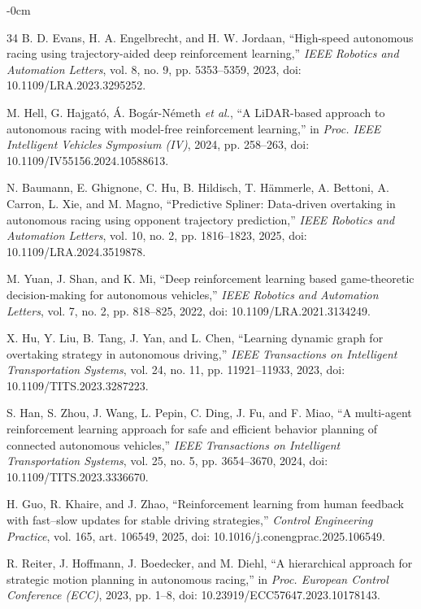 \documentclass[sensors,article,submit,moreauthors]{Definitions/mdpi}
\begin{document}
\begin{adjustwidth}{-\extralength}{0cm}
\begin{thebibliography}{34}
B. D. Evans, H. A. Engelbrecht, and H. W. Jordaan,
``High-speed autonomous racing using trajectory-aided deep reinforcement
learning,'' \emph{IEEE Robotics and Automation Letters}, vol. 8, no. 9,
pp. 5353--5359, 2023, doi: 10.1109/LRA.2023.3295252.

M. Hell, G. Hajgat\'o, \'A. Bog\'ar-N\'emeth \emph{et al.},
``A LiDAR-based approach to autonomous racing with model-free reinforcement
learning,'' in \emph{Proc. IEEE Intelligent Vehicles Symposium (IV)}, 2024,
pp. 258--263, doi: 10.1109/IV55156.2024.10588613.

N. Baumann, E. Ghignone, C. Hu, B. Hildisch, T. H\"ammerle,
A. Bettoni, A. Carron, L. Xie, and M. Magno,
``Predictive Spliner: Data-driven overtaking in autonomous racing using
opponent trajectory prediction,'' \emph{IEEE Robotics and Automation
Letters}, vol. 10, no. 2, pp. 1816--1823, 2025,
doi: 10.1109/LRA.2024.3519878.

M. Yuan, J. Shan, and K. Mi,
``Deep reinforcement learning based game-theoretic decision-making for
autonomous vehicles,'' \emph{IEEE Robotics and Automation Letters}, vol. 7,
no. 2, pp. 818--825, 2022, doi: 10.1109/LRA.2021.3134249.

X. Hu, Y. Liu, B. Tang, J. Yan, and L. Chen,
``Learning dynamic graph for overtaking strategy in autonomous driving,''
\emph{IEEE Transactions on Intelligent Transportation Systems}, vol. 24,
no. 11, pp. 11921--11933, 2023, doi: 10.1109/TITS.2023.3287223.

S. Han, S. Zhou, J. Wang, L. Pepin, C. Ding, J. Fu, and F. Miao,
``A multi-agent reinforcement learning approach for safe and efficient
behavior planning of connected autonomous vehicles,''
\emph{IEEE Transactions on Intelligent Transportation Systems}, vol. 25,
no. 5, pp. 3654--3670, 2024, doi: 10.1109/TITS.2023.3336670.

H. Guo, R. Khaire, and J. Zhao,
``Reinforcement learning from human feedback with fast--slow updates for
stable driving strategies,'' \emph{Control Engineering Practice}, vol. 165,
art. 106549, 2025, doi: 10.1016/j.conengprac.2025.106549.

R. Reiter, J. Hoffmann, J. Boedecker, and M. Diehl,
``A hierarchical approach for strategic motion planning in autonomous
racing,'' in \emph{Proc. European Control Conference (ECC)}, 2023, pp. 1--8,
doi: 10.23919/ECC57647.2023.10178143.


\end{thebibliography}
\end{adjustwidth}
\end{document}
